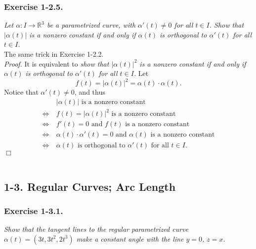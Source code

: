 \documentclass{article}
\begin{document}
\subsubsection*{Exercise 1-2.5.}
\emph{Let $\alpha: I \to \mathbb{R}^3$ be a parametrized curve,
with $\alpha'(t) \neq 0$ for all $t \in I$.
Show that $|\alpha(t)|$ is a nonzero constant
if and only if
$\alpha(t)$ is orthogonal to $\alpha'(t)$ for all $t \in I$.} \\

The same trick in Exercise 1-2.2. \\



\emph{Proof.}
It is equivalent to
\emph{show that $|\alpha(t)|^2$ is a nonzero constant
if and only if
$\alpha(t)$ is orthogonal to $\alpha'(t)$ for all $t \in I$.}
Let $$f(t) = |\alpha(t)|^2 = \alpha(t) \cdot \alpha(t).$$
Notice that $\alpha'(t) \neq 0$, and thus
\begin{align*}
  & \: |\alpha(t)| \text{ is a nonzero constant} \\
  \Longleftrightarrow& \:
  f(t) = |\alpha(t)|^2 \text{ is a nonzero constant} \\
  \Longleftrightarrow& \:
  f'(t) = 0 \text{ and } f(t) \text{ is a nonzero constant} \\
  \Longleftrightarrow& \:
  \alpha(t) \cdot \alpha'(t) = 0 \text{ and } \alpha(t) \text{ is a nonzero constant} \\
  \Longleftrightarrow& \:
  \alpha(t) \text{ is orthogonal to } \alpha'(t) \text{ for all } t \in I.
\end{align*}
$\Box$ \\\\






\subsection*{1-3. Regular Curves; Arc Length \\}



\subsubsection*{Exercise 1-3.1.}
\emph{Show that the tangent lines to the regular parametrized curve
$\alpha(t) = (3t, 3t^2, 2t^3)$ make a constant angle with the line $y = 0$, $z = x$. } \\
\end{document}

